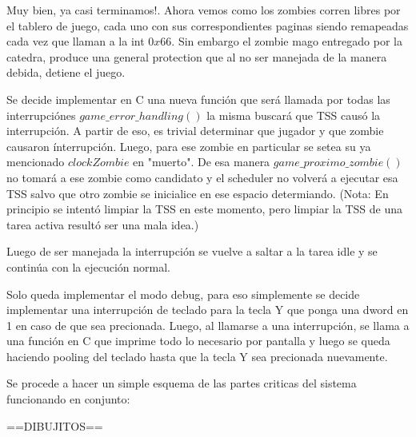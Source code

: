 \documentclass[a4paper]{article}
\begin{document}
Muy bien, ya casi terminamos!. Ahora vemos como los zombies corren libres por el tablero de juego, cada uno con sus correspondientes paginas siendo remapeadas cada vez que llaman a la int $0x66$. Sin embargo el zombie mago entregado por la catedra, produce una general protection que al no ser manejada de la manera debida, detiene el juego.

Se decide implementar en C una nueva función que será llamada por todas las interrupciónes $game\_error\_handling()$ la misma buscará que TSS causó la interrupción. A partir de eso, es trivial determinar que jugador y que zombie causaron ínterrupción. Luego, para ese zombie en particular se setea su ya mencionado $clockZombie$ en "muerto". De esa manera $game\_ proximo\_ zombie()$ no tomará a ese zombie como candidato y el scheduler no volverá a ejecutar esa TSS salvo que otro zombie se inicialice en ese espacio determiando. (Nota: En principio se intentó limpiar la TSS en este momento, pero limpiar la TSS de una tarea activa resultó ser una mala idea.)

Luego de ser manejada la interrupción se vuelve a saltar a la tarea idle y se continúa con la ejecución normal.

Solo queda implementar el modo debug, para eso simplemente se decide implementar una interrupción de teclado para la tecla Y que ponga una dword en 1 en caso de que sea precionada. Luego, al llamarse a una interrupción, se llama a una función en C que imprime todo lo necesario por pantalla y luego se queda haciendo pooling del teclado hasta que la tecla Y sea precionada nuevamente.

Se procede a hacer un simple esquema de las partes criticas del sistema funcionando en conjunto:

==DIBUJITOS==
\end{document}
